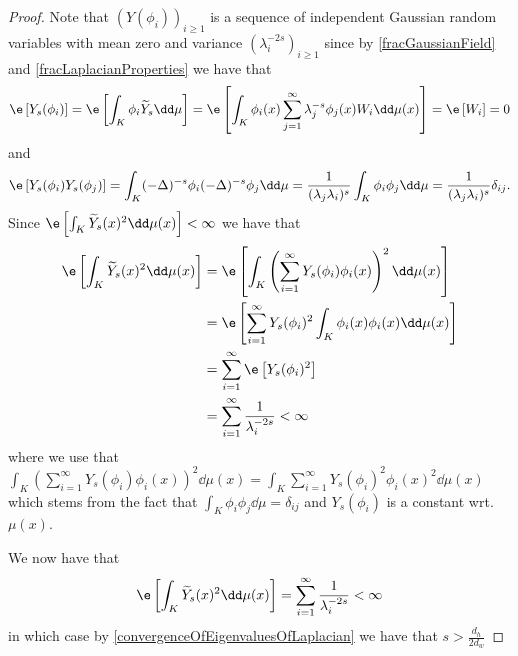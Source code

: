 \begin{proof}
	Note that $(Y(\phi_i))_{i \geq 1}$ is a sequence of independent Gaussian random variables with mean zero and variance $(\lambda_{i}^{-2s})_{i \geq 1}$ since by \cref{fracGaussianField} and \cref{fracLaplacianProperties} we have that
	\begin{equation}
		\e \left[Y_s(\phi_i)\right] =\e \left[\int_{K} \phi_i \widetilde{Y}_s \dd \mu \right] = \e \left[\int_{K} \phi_i(x) \sum_{j = 1}^{\infty} \lambda_j^{-s}\phi_j(x)W_i \dd \mu(x) \right]= \e \left[W_i\right] =0
	\end{equation}
	and
	\begin{equation}
		\e \left[Y_s(\phi_i)Y_s(\phi_j)\right] = \int_{K}  (-\Delta)^{-s}\phi_i (-\Delta)^{-s}\phi_j \dd \mu = \frac{1}{(\lambda_{j}\lambda_i)^{s}} \int_{K} \phi_i \phi_j \dd \mu = \frac{1}{(\lambda_{j}\lambda_i)^{s}} \delta_{ij}.
	\end{equation}
	Since $\e \left[\int_{K} \widetilde{Y}_{s}(x)^2 \dd \mu (x)\right] < \infty$  we have that
	\begin{align}
		\e \left[\int_{K} \widetilde{Y}_{s}(x)^2 \dd \mu (x)\right]  &= \e \left[\int_{K} \left(\sum_{i = 1}^{\infty} Y_s(\phi_i)\phi_i(x)\right)^{2}\dd\mu(x)\right] \\
		& = \e \left[\sum_{i = 1}^{\infty} Y_s(\phi_i)^2\int_{K} \phi_i(x)\phi_i(x) \dd \mu (x) \right] \\
		& = \sum_{i = 1}^{\infty}\e \left[Y_s(\phi_i)^2\right] \\
		& = \sum_{i = 1}^{\infty} \frac{1}{\lambda_i^{-2s}} < \infty
	\end{align}
	where we use that $\int_{K} (\sum_{i = 1}^{\infty} Y_s(\phi_i)\phi_i(x))^2 \dd \mu(x) = \int_{K} \sum_{i = 1}^{\infty} Y_s(\phi_i)^2 \phi_i(x)^2 \dd \mu (x)$ which stems from the fact that $\int_{K}\phi_i \phi_j \dd \mu = \delta_{ij}$ and $Y_s(\phi_i)$ is a constant wrt. $\mu(x)$.
	
	We now have that
	\begin{equation}
		\e \left[\int_{K} \widetilde{Y}_{s}(x)^2 \dd \mu (x)\right] = \sum_{i = 1}^{\infty} \frac{1}{\lambda_i^{-2s}} < \infty
	\end{equation}
	in which case by \cref{convergenceOfEigenvaluesOfLaplacian} we have that $s > \frac{d_h}{2d_w}$
\end{proof}